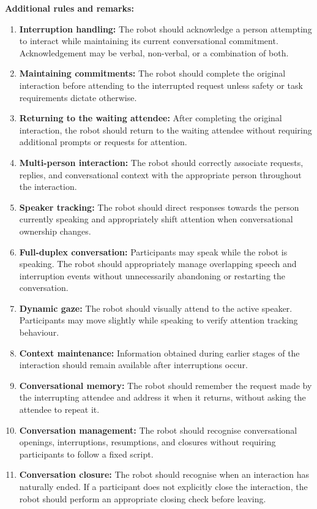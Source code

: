 \medskip
\noindent \textbf{Additional rules and remarks:}
\begin{enumerate}[nosep]
	\item \textbf{Interruption handling:} The robot should acknowledge a person attempting to interact while maintaining its current conversational commitment. Acknowledgement may be verbal, non-verbal, or a combination of both.
	\item \textbf{Maintaining commitments:} The robot should complete the original interaction before attending to the interrupted request unless safety or task requirements dictate otherwise.
	\item \textbf{Returning to the waiting attendee:} After completing the original interaction, the robot should return to the waiting attendee without requiring additional prompts or requests for attention.
	\item \textbf{Multi-person interaction:} The robot should correctly associate requests, replies, and conversational context with the appropriate person throughout the interaction.
	\item \textbf{Speaker tracking:} The robot should direct responses towards the person currently speaking and appropriately shift attention when conversational ownership changes.
	\item \textbf{Full-duplex conversation:} Participants may speak while the robot is speaking. The robot should appropriately manage overlapping speech and interruption events without unnecessarily abandoning or restarting the conversation.
	\item \textbf{Dynamic gaze:} The robot should visually attend to the active speaker. Participants may move slightly while speaking to verify attention tracking behaviour.
	\item \textbf{Context maintenance:} Information obtained during earlier stages of the interaction should remain available after interruptions occur.
	\item \textbf{Conversational memory:} The robot should remember the request made by the interrupting attendee and address it when it returns, without asking the attendee to repeat it.
	\item \textbf{Conversation management:} The robot should recognise conversational openings, interruptions, resumptions, and closures without requiring participants to follow a fixed script.
	\item \textbf{Conversation closure:} The robot should recognise when an interaction has naturally ended. If a participant does not explicitly close the interaction, the robot should perform an appropriate closing check before leaving.
\end{enumerate}

